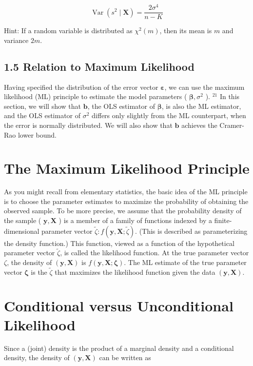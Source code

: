 \documentclass[10pt]{article}
\begin{document}
$$
\operatorname{Var}\left(s^{2} \mid \mathbf{X}\right)=\frac{2 \sigma^{4}}{n-K}
$$

Hint: If a random variable is distributed as $\chi^{2}(m)$, then its mean is $m$ and variance $2 m$.

\subsection*{1.5 Relation to Maximum Likelihood}
Having specified the distribution of the error vector $\boldsymbol{\varepsilon}$, we can use the maximum likelihood (ML) principle to estimate the model parameters ( $\boldsymbol{\beta}, \sigma^{2}$ ). ${ }^{21}$ In this section, we will show that $\mathbf{b}$, the OLS estimator of $\boldsymbol{\beta}$, is also the ML estimator, and the OLS estimator of $\sigma^{2}$ differs only slightly from the ML counterpart, when the error is normally distributed. We will also show that $\mathbf{b}$ achieves the Cramer-Rao lower bound.

\section*{The Maximum Likelihood Principle}
As you might recall from elementary statistics, the basic idea of the ML principle is to choose the parameter estimates to maximize the probability of obtaining the observed sample. To be more precise, we assume that the probability density of the sample ( $\mathbf{y}, \mathbf{X}$ ) is a member of a family of functions indexed by a finite-dimensional parameter vector $\tilde{\zeta}: f(\mathbf{y}, \mathbf{X} ; \tilde{\zeta})$. (This is described as parameterizing the density function.) This function, viewed as a function of the hypothetical parameter vector $\tilde{\zeta}$, is called the likelihood function. At the true parameter vector $\zeta$, the density of $(\mathbf{y}, \mathbf{X})$ is $f(\mathbf{y}, \mathbf{X} ; \boldsymbol{\zeta})$. The ML estimate of the true parameter vector $\boldsymbol{\zeta}$ is the $\tilde{\zeta}$ that maximizes the likelihood function given the data $(\mathbf{y}, \mathbf{X})$.

\section*{Conditional versus Unconditional Likelihood}
Since a (joint) density is the product of a marginal density and a conditional density, the density of $(\mathbf{y}, \mathbf{X})$ can be written as
\end{document}
